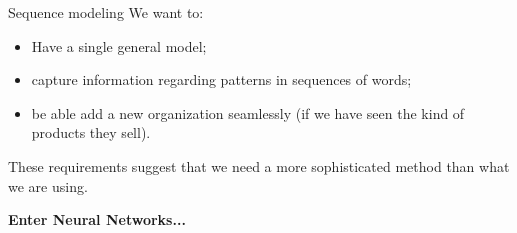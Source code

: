 \documentclass[9pt]{beamer}
\begin{document}
\begin{frame}{Sequence modeling}
	We want to:
	\begin{itemize}
		\item Have a single general model;
		\item capture information regarding patterns in sequences of words;
		\item be able add a new organization seamlessly (if we have seen the kind of products they sell).
	\end{itemize}
	\vspace{0.5cm}
	These requirements suggest that we need a more sophisticated method than what we are using.
	
	\pause
	\vspace{1cm}
	\begin{center}
		\Large{\textbf{Enter Neural Networks...}}
	\end{center}
	
\end{frame}
\end{document}
